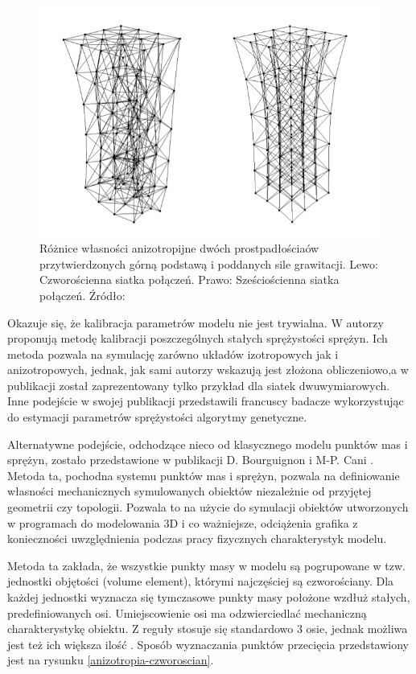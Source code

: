 \begin{figure}[ht]
\centering
\includegraphics[scale=0.5]{images/anisotropy.png}
\caption{Różnice własności anizotropijne dwóch prostpadłościaów
	przytwierdzonych górną podstawą i poddanych sile grawitacji. Lewo:
		Czworościenna siatka połączeń. Prawo: Sześciościenna siatka połączeń. Źródło: \cite{ca}}
\label{anizotropia}
\end{figure}

Okazuje się, że kalibracja parametrów modelu nie jest trywialna. W \cite{usa}
autorzy proponują metodę kalibracji poszczególnych stałych sprężystości sprężyn.
Ich metoda pozwala na symulację zarówno układów izotropowych jak i anizotropowych,
jednak, jak sami autorzy wskazują jest złożona obliczeniowo,a w publikacji
został zaprezentowany tylko przykład dla siatek dwuwymiarowych. Inne podejście
w swojej publikacji przedstawili francuscy badacze wykorzystując do estymacji
parametrów sprężystości algorytmy genetyczne.\cite{ei}

Alternatywne podejście, odchodzące nieco od klasycznego modelu punktów mas i
sprężyn, zostało przedstawione w publikacji D. Bourguignon i M-P. Cani
\cite{ca}. Metoda ta, pochodna systemu punktów mas i sprężyn, pozwala na
definiowanie własności mechanicznych symulowanych obiektów niezależnie od
przyjętej geometrii czy topologii. Pozwala to na użycie do symulacji obiektów
utworzonych w programach do modelowania 3D i co ważniejsze, odciążenia grafika z
konieczności uwzględnienia podczas pracy fizycznych charakterystyk
modelu.\cite{ca}

Metoda ta zakłada, że wszystkie punkty masy w modelu są pogrupowane w tzw. jednostki
objętości (volume element), którymi najczęściej są czworościany. Dla każdej
jednostki wyznacza się tymczasowe punkty masy położone wzdłuż stałych,
		  predefiniowanych osi. Umiejscowienie osi ma odzwierciedlać mechaniczną
		  charakterystykę obiektu. Z reguły stosuje się standardowo 3 osie,
		  jednak możliwa jest też ich większa ilość \cite{ca}. Sposób
		  wyznaczania punktów przecięcia przedstawiony jest na rysunku
		  \ref{anizotropia-czworoscian}.

